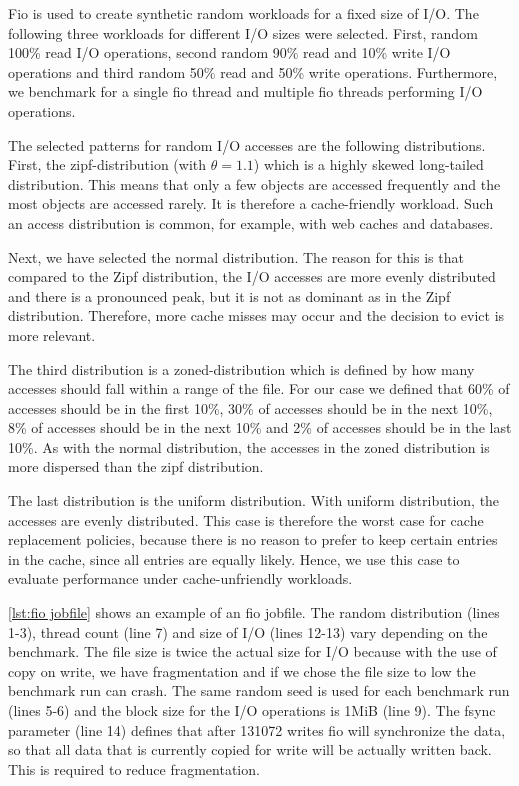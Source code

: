 \documentclass[
	12pt,
	a4paper,
	abstract,
	bibliography=totoc,
	chapterprefix,
	headings=openright,
	numbers=endperiod,
	parskip=half,
	twoside,
]{scrreprt}
\begin{document}
Fio is used to create synthetic random workloads for a fixed size of I/O.
The following three workloads for different I/O sizes were selected.
First, random 100\% read I/O operations, second random 90\% read and 10\% write I/O operations
and third random 50\% read and 50\% write operations. 
Furthermore, we benchmark for a single fio thread and multiple fio threads performing I/O operations.

The selected patterns for random I/O accesses are the following distributions.
First, the zipf-distribution (with $\theta=1.1$) which is a highly skewed long-tailed distribution.
This means that only a few objects are accessed frequently and the most objects are accessed rarely.
It is therefore a cache-friendly workload.
Such an access distribution is common, for example, with web caches and databases.

Next, we have selected the normal distribution.
The reason for this is that compared to the Zipf distribution, 
the I/O accesses are more evenly distributed and there is a pronounced peak, 
but it is not as dominant as in the Zipf distribution.
Therefore, more cache misses may occur and 
the decision to evict is more relevant.

The third distribution is a zoned-distribution which is defined by 
how many accesses should fall within a range of the file.
For our case we defined that 60\% of accesses should be in the first 10\%,
30\% of accesses should be in the next 10\%, 8\% of accesses should be in the next 10\% and
2\% of accesses should be in the last 10\%.
As with the normal distribution, the accesses in the 
zoned distribution is more dispersed than the zipf distribution.

The last distribution is the uniform distribution.
With uniform distribution, the accesses are evenly distributed.
This case is therefore the worst case for cache replacement policies, 
because there is no reason to prefer to keep certain entries in the cache, 
since all entries are equally likely.
Hence, we use this case to evaluate performance under cache-unfriendly workloads.

\cref{lst:fio jobfile} shows an example of an fio jobfile.
The random distribution (lines 1-3), thread count (line 7) and size of I/O 
(lines 12-13) vary depending on the benchmark.
The file size is twice the actual size for I/O because with the use of  copy on write, 
we have fragmentation and if we chose the file size to low the benchmark run can crash.
The same random seed is used for each benchmark run (lines 5-6) and the block size 
for the I/O operations is 1MiB (line 9).
The fsync parameter (line 14) defines that after 131072 writes fio will synchronize the  
data, so that all data that is currently copied for write will be actually written back.
This is required to reduce fragmentation.
\end{document}
